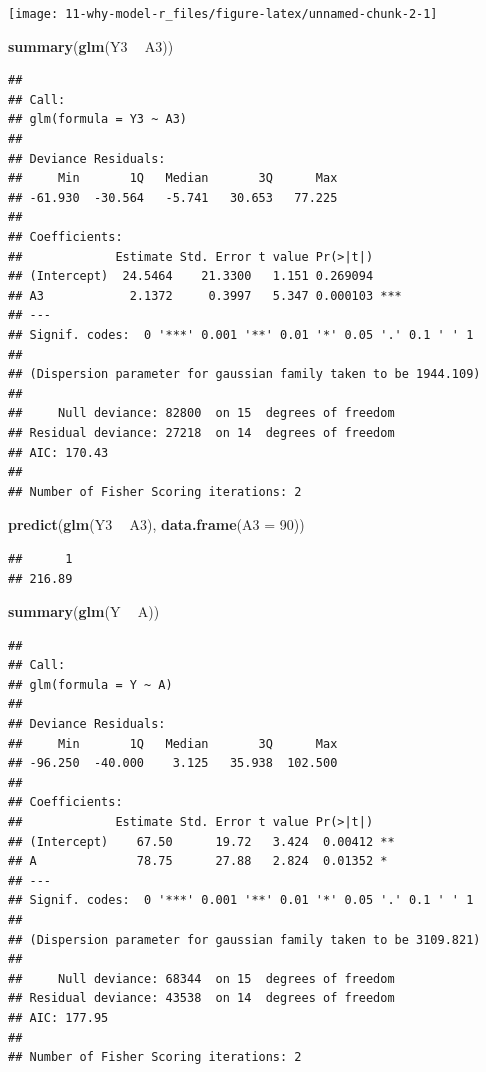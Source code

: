 \documentclass[
  10pt,
]{book}
\newenvironment{Shaded}{\begin{snugshade}}{\end{snugshade}}
\newcommand{\DataTypeTok}[1]{\textcolor[rgb]{0.13,0.29,0.53}{#1}}
\newcommand{\DecValTok}[1]{\textcolor[rgb]{0.00,0.00,0.81}{#1}}
\newcommand{\KeywordTok}[1]{\textcolor[rgb]{0.13,0.29,0.53}{\textbf{#1}}}
\newcommand{\NormalTok}[1]{#1}
\newcommand{\OperatorTok}[1]{\textcolor[rgb]{0.81,0.36,0.00}{\textbf{#1}}}
\newcommand{\StringTok}[1]{\textcolor[rgb]{0.31,0.60,0.02}{#1}}
\begin{document}
\begin{center}\texttt{[image: 11-why-model-r\_files/figure-latex/unnamed-chunk-2-1]} \end{center}

\begin{Shaded}
\begin{Highlighting}[]
\KeywordTok{summary}\NormalTok{(}\KeywordTok{glm}\NormalTok{(Y3 }\OperatorTok{~}\StringTok{ }\NormalTok{A3))}
\end{Highlighting}
\end{Shaded}

\begin{verbatim}
## 
## Call:
## glm(formula = Y3 ~ A3)
## 
## Deviance Residuals: 
##     Min       1Q   Median       3Q      Max  
## -61.930  -30.564   -5.741   30.653   77.225  
## 
## Coefficients:
##             Estimate Std. Error t value Pr(>|t|)    
## (Intercept)  24.5464    21.3300   1.151 0.269094    
## A3            2.1372     0.3997   5.347 0.000103 ***
## ---
## Signif. codes:  0 '***' 0.001 '**' 0.01 '*' 0.05 '.' 0.1 ' ' 1
## 
## (Dispersion parameter for gaussian family taken to be 1944.109)
## 
##     Null deviance: 82800  on 15  degrees of freedom
## Residual deviance: 27218  on 14  degrees of freedom
## AIC: 170.43
## 
## Number of Fisher Scoring iterations: 2
\end{verbatim}

\begin{Shaded}
\begin{Highlighting}[]
\KeywordTok{predict}\NormalTok{(}\KeywordTok{glm}\NormalTok{(Y3 }\OperatorTok{~}\StringTok{ }\NormalTok{A3), }\KeywordTok{data.frame}\NormalTok{(}\DataTypeTok{A3 =} \DecValTok{90}\NormalTok{))}
\end{Highlighting}
\end{Shaded}

\begin{verbatim}
##      1 
## 216.89
\end{verbatim}

\begin{Shaded}
\begin{Highlighting}[]
\KeywordTok{summary}\NormalTok{(}\KeywordTok{glm}\NormalTok{(Y }\OperatorTok{~}\StringTok{ }\NormalTok{A))}
\end{Highlighting}
\end{Shaded}

\begin{verbatim}
## 
## Call:
## glm(formula = Y ~ A)
## 
## Deviance Residuals: 
##     Min       1Q   Median       3Q      Max  
## -96.250  -40.000    3.125   35.938  102.500  
## 
## Coefficients:
##             Estimate Std. Error t value Pr(>|t|)   
## (Intercept)    67.50      19.72   3.424  0.00412 **
## A              78.75      27.88   2.824  0.01352 * 
## ---
## Signif. codes:  0 '***' 0.001 '**' 0.01 '*' 0.05 '.' 0.1 ' ' 1
## 
## (Dispersion parameter for gaussian family taken to be 3109.821)
## 
##     Null deviance: 68344  on 15  degrees of freedom
## Residual deviance: 43538  on 14  degrees of freedom
## AIC: 177.95
## 
## Number of Fisher Scoring iterations: 2
\end{verbatim}
\end{document}
